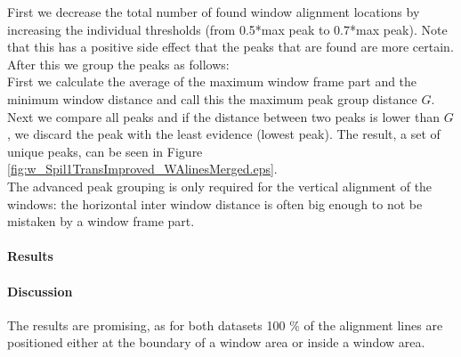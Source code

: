 First we decrease the total number of found window alignment locations by increasing the individual thresholds (from 0.5*max
peak to 0.7*max peak). Note that this has a positive side effect that the peaks that are found are more certain.
After this we group the peaks as follows: \\
First we calculate the average of the maximum window frame part and the minimum window
distance and call this the maximum peak group distance $G$.
Next we compare all peaks and if the distance between two peaks is lower than
$G$, we discard the peak with the least evidence (lowest peak). The result,
a set of unique peaks, can be seen in Figure \ref{fig:w_Spil1TransImproved_WAlinesMerged.eps}.\\

The advanced peak grouping is only required for the vertical alignment
of the windows: the horizontal inter window distance is often big enough to not
be mistaken by a window frame part.


\newpage
\paragraph{Results}


\clearpage

\paragraph{Discussion}
The results are promising, as for both datasets 100 \% of the alignment lines
are positioned either at the boundary of a window area or inside a window area.

